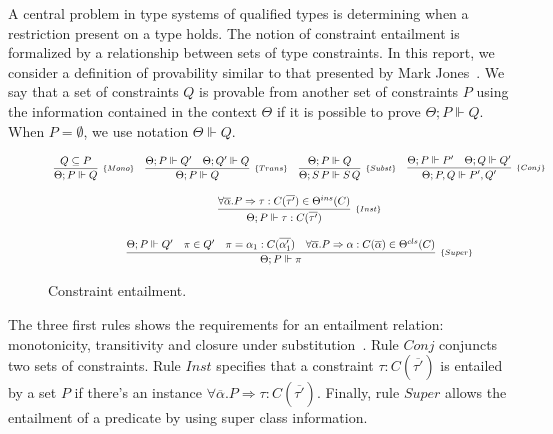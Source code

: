 \documentclass[a4paper, 11pt]{article}
\theoremstyle{definition}
\begin{document}
A central problem in type systems of qualified types is determining 
when a restriction present on a type holds. The notion of 
constraint entailment is formalized by a relationship between 
sets of type constraints. In this report, we consider a definition of 
provability similar to that presented by Mark Jones~\cite{Jones1995}.
We say that a set of constraints $Q$ is provable from another set
of constraints $P$ using the information contained in the 
context $\Theta$ if it is possible to prove $\Theta ; P \Vdash Q$.
When $P = \emptyset$, we use notation $\Theta \Vdash Q$.

\begin{figure}[htb]
  \[
    \begin{array}{cccc}
      \infer[_{\{Mono\}}]
            {\Theta ; P \Vdash Q} 
            {Q \subseteq P} 
      & 
      \infer[_{\{Trans\}}]
            {\Theta ; P \Vdash Q} 
            {\Theta ; P \Vdash Q' 
             & 
             \Theta ; Q' \Vdash Q}
      & 
      \infer[_{\{Subst\}}]
            {\Theta ; S\,P \Vdash S\,Q}
            {\Theta ; P \Vdash Q} 
      & 
      \infer[_{\{Conj\}}]
            {\Theta ; P, Q \Vdash P', Q'}
            {\Theta ; P \Vdash P' & 
             \Theta ; Q \Vdash Q'} 
      \\ \\
      \multicolumn{4}{c}{
        \infer[_{\{Inst\}}]
              {\Theta ; P \Vdash \tau : C(\overline{\tau'}) }
              {\forall \overline{\alpha} .  P \Rightarrow \tau : C(\overline{\tau'}) \in \Theta^{ins}(C)}
      } 
      \\ \\
      \multicolumn{4}{c}{
        \infer[_{\{Super\}}]
              {\Theta ; P \Vdash \pi}
              {\Theta ; P \Vdash Q' & 
               \pi \in Q' &
               \pi = \alpha_1 : C(\overline{\alpha'_1}) & 
               \forall\overline{\alpha}. P \Rightarrow \alpha : C(\overline{\alpha}) \in \Theta^{cls}(C)} 
      }
    \end{array}
  \]
  \centering
  \caption{Constraint entailment.}
  \label{fig:constraint-entailment}
\end{figure}
The three first rules shows the requirements for an entailment 
relation: monotonicity, transitivity and closure under 
substitution~\cite{Jones1995}. Rule $Conj$ conjuncts two sets 
of constraints. Rule $Inst$ specifies that a constraint 
$\tau : C(\overline{\tau'})$ is entailed by a set $P$ if 
there's an instance 
$\forall \overline{\alpha} .  P \Rightarrow \tau : C(\overline{\tau'})$. 
Finally, rule $Super$ allows the entailment of a predicate 
by using super class information.
\end{document}
